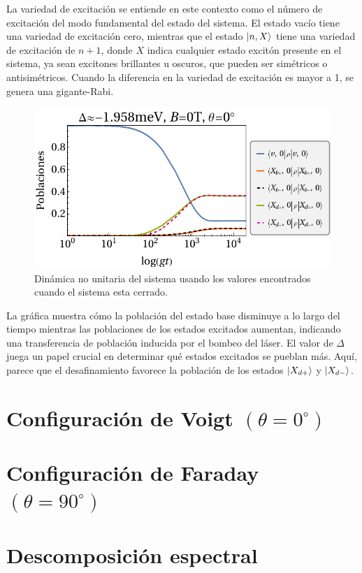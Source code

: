 \documentclass[main.tex]{subfiles}
\begin{document}
La variedad de excitación se entiende en este contexto como el número de excitación del modo fundamental del estado del sistema. El estado vacío tiene una variedad de excitación cero, mientras que el estado $\ket{n,X}$ tiene una variedad de excitación de $n+1$, donde $X$ indica cualquier estado excitón presente en el sistema, ya sean excitones brillantes u oscuros, que pueden ser simétricos o antisimétricos. Cuando la diferencia en la variedad de excitación es mayor a 1, se genera una gigante-Rabi.

\begin{figure}[hb]
	\centering
	\includegraphics[width=0.7\linewidth]{res/ρ_B0}
	\caption{Din\'amica no unitaria del sistema usando los valores encontrados cuando el sistema esta cerrado.}
	\label{fig:b0}
\end{figure}

La gráfica muestra cómo la población del estado base disminuye a lo largo del tiempo mientras las poblaciones de los estados excitados aumentan, indicando una transferencia de población inducida por el bombeo del láser. El valor de \(\Delta\) juega un papel crucial en determinar qué estados excitados se pueblan más. Aquí, parece que el desafinamiento favorece la población de los estados \(\ket{X_{d+}}\) y \(\ket{X_{d-}}\).

\section{Configuraci\'on de Voigt $(\theta = 0^\circ)$}

\section{Configuraci\'on de Faraday $(\theta = 90^\circ)$}

\section{Descomposici\'on espectral}
\end{document}
